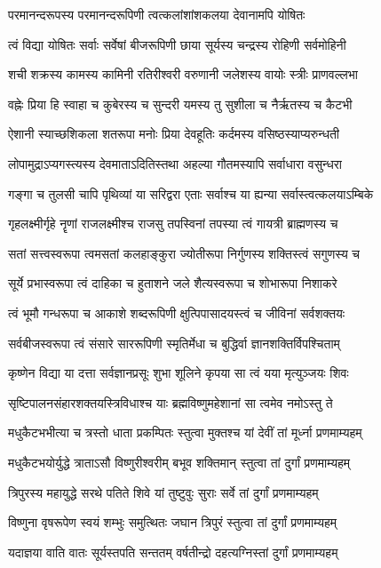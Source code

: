 \twolineshloka
{परमानन्दरूपस्य परमानन्दरूपिणी}
{त्वत्कलांशांशकलया देवानामपि योषितः}

\twolineshloka
{त्वं विद्या योषितः सर्वाः सर्वेषां बीजरूपिणी}
{छाया सूर्यस्य चन्द्रस्य रोहिणी सर्वमोहिनी}

\twolineshloka
{शची शक्रस्य कामस्य कामिनी रतिरीश्वरी}
{वरुणानी जलेशस्य वायोः स्त्रीः प्राणवल्लभा}

\twolineshloka
{वह्नेः प्रिया हि स्वाहा च कुबेरस्य च सुन्दरी}
{यमस्य तु सुशीला च नैर्ऋतस्य च कैटभी}

\twolineshloka
{ऐशानी स्याच्छशिकला शतरूपा मनोः प्रिया}
{देवहूतिः कर्दमस्य वसिष्ठस्याप्यरुन्धती}

\twolineshloka
{लोपामुद्राऽप्यगस्त्यस्य देवमाताऽदितिस्तथा}
{अहल्या गौतमस्यापि सर्वाधारा वसुन्धरा}

\twolineshloka
{गङ्गा च तुलसी चापि पृथिव्यां या सरिद्वरा}
{एताः सर्वाश्च या ह्यन्या सर्वास्त्वत्कलयाऽम्बिके}

\twolineshloka
{गृहलक्ष्मीर्गृहे नॄणां राजलक्ष्मीश्च राजसु}
{तपस्विनां तपस्या त्वं गायत्री ब्राह्मणस्य च}

\twolineshloka
{सतां सत्त्‍‌वस्वरूपा त्वमसतां कलहाङ्कुरा}
{ज्योतीरूपा निर्गुणस्य शक्तिस्त्वं सगुणस्य च}

\twolineshloka
{सूर्ये प्रभास्वरूपा त्वं दाहिका च हुताशने}
{जले शैत्यस्वरूपा च शोभारूपा निशाकरे}

\twolineshloka
{त्वं भूमौ गन्धरूपा च आकाशे शब्दरूपिणी}
{क्षुत्पिपासादयस्त्वं च जीविनां सर्वशक्तयः}

\twolineshloka
{सर्वबीजस्वरूपा त्वं संसारे साररूपिणी}
{स्मृतिर्मेधा च बुद्धिर्वा ज्ञानशक्तिर्विपश्चिताम्}

\twolineshloka
{कृष्णेन विद्या या दत्ता सर्वज्ञानप्रसूः शुभा}
{शूलिने कृपया सा त्वं यया मृत्युञ्जयः शिवः}

\twolineshloka
{सृष्टिपालनसंहारशक्तयस्त्रिविधाश्च याः}
{ब्रह्मविष्णुमहेशानां सा त्वमेव नमोऽस्तु ते}

\twolineshloka
{मधुकैटभभीत्या च त्रस्तो धाता प्रकम्पितः}
{स्तुत्वा मुक्तश्च यां देवीं तां मूर्ध्ना प्रणमाम्यहम्}

\twolineshloka
{मधुकैटभयोर्युद्धे त्राताऽसौ विष्णुरीश्वरीम्}
{बभूव शक्तिमान् स्तुत्वा तां दुर्गां प्रणमाम्यहम्}

\twolineshloka
{त्रिपुरस्य महायुद्धे सरथे पतिते शिवे}
{यां तुष्टुवुः सुराः सर्वे तां दुर्गां प्रणमाम्यहम्}

\twolineshloka
{विष्णुना वृषरूपेण स्वयं शम्भुः समुत्थितः}
{जघान त्रिपुरं स्तुत्वा तां दुर्गां प्रणमाम्यहम्}

\twolineshloka
{यदाज्ञया वाति वातः सूर्यस्तपति सन्ततम्}
{वर्षतीन्द्रो दहत्यग्निस्तां दुर्गां प्रणमाम्यहम्}

